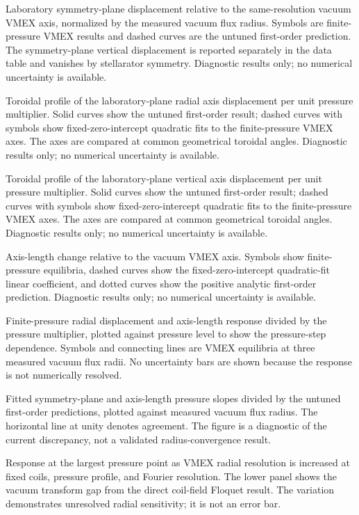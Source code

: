 \caption{Laboratory symmetry-plane displacement relative to the same-resolution
vacuum VMEX axis, normalized by the measured vacuum flux radius. Symbols are
finite-pressure VMEX results and dashed curves are the untuned first-order
prediction. The symmetry-plane vertical displacement is reported separately in
the data table and vanishes by stellarator symmetry. Diagnostic results only;
no numerical uncertainty is available.}
\label{fig:shafranov-symmetry-plane}

\caption{Toroidal profile of the laboratory-plane radial axis displacement per
unit pressure multiplier. Solid curves show the untuned first-order result;
dashed curves with symbols show fixed-zero-intercept quadratic fits to the
finite-pressure VMEX axes. The axes are compared at common geometrical toroidal
angles. Diagnostic results only; no numerical uncertainty is available.}
\label{fig:shafranov-radial-profile}

\caption{Toroidal profile of the laboratory-plane vertical axis displacement
per unit pressure multiplier. Solid curves show the untuned first-order result;
dashed curves with symbols show fixed-zero-intercept quadratic fits to the
finite-pressure VMEX axes. The axes are compared at common geometrical toroidal
angles. Diagnostic results only; no numerical uncertainty is available.}
\label{fig:shafranov-vertical-profile}

\caption{Axis-length change relative to the vacuum VMEX axis. Symbols show
finite-pressure equilibria, dashed curves show the fixed-zero-intercept
quadratic-fit linear coefficient, and dotted curves show the positive analytic
first-order prediction. Diagnostic results only; no numerical uncertainty is
available.}
\label{fig:shafranov-axis-length}

\caption{Finite-pressure radial displacement and axis-length response divided
by the pressure multiplier, plotted against pressure level to show the
pressure-step dependence. Symbols and connecting lines are VMEX equilibria at
three measured vacuum flux radii. No uncertainty bars are shown because the
response is not numerically resolved.}
\label{fig:shafranov-pressure-step}

\caption{Fitted symmetry-plane and axis-length pressure slopes divided by the
untuned first-order predictions, plotted against measured vacuum flux radius.
The horizontal line at unity denotes agreement. The figure is a diagnostic of
the current discrepancy, not a validated radius-convergence result.}
\label{fig:shafranov-radius-ratio}

\caption{Response at the largest pressure point as VMEX radial resolution is
increased at fixed coils, pressure profile, and Fourier resolution. The lower
panel shows the vacuum transform gap from the direct coil-field Floquet result.
The variation demonstrates unresolved radial sensitivity; it is not an error
bar.}
\label{fig:shafranov-radial-resolution}
